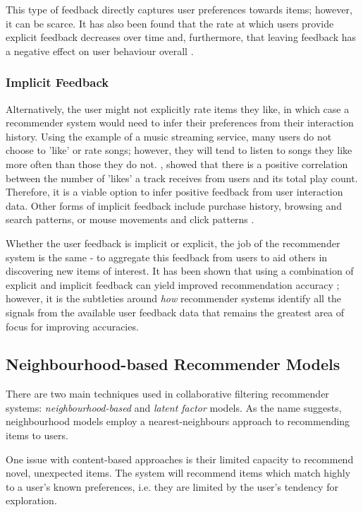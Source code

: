 This type of feedback directly captures user preferences towards items; however, it can be scarce. It has also been found that the rate at which users provide explicit feedback decreases over time and, furthermore, that leaving feedback has a negative effect on user behaviour overall \parencite{cf_1.5_explicit}.

\subsubsection{Implicit Feedback}
Alternatively, the user might not explicitly rate items they like, in which case a recommender system would need to infer their preferences from their interaction history. Using the example of a music streaming service, many users do not choose to 'like' or rate songs; however, they will tend to listen to songs they like more often than those they do not. \cite{cf_1.5_explicit}, showed that there is a positive correlation between the number of 'likes' a track receives from users and its total play count. Therefore, it is a viable option to infer positive feedback from user interaction data. Other forms of implicit feedback include purchase history, browsing and search patterns, or mouse movements and click patterns \parencite{handbook_1.5_cf}.

Whether the user feedback is implicit or explicit, the job of the recommender system is the same - to aggregate this feedback from users to aid others in discovering new items of interest. It has been shown that using a combination of explicit and implicit feedback can yield improved recommendation accuracy \parencite{cf_1.4_comparison}; however, it is the subtleties around \textit{how} recommender systems identify all the signals from the available user feedback data that remains the greatest area of focus for improving accuracies.

\subsection{Neighbourhood-based Recommender Models}
There are two main techniques used in collaborative filtering recommender systems: \textit{neighbourhood-based} and \textit{latent factor} models. As the name suggests, neighbourhood models employ a nearest-neighbours approach to recommending items to users.

One issue with content-based approaches is their limited capacity to recommend novel, unexpected items. The system will recommend items which match highly to a user's known preferences, i.e. they are limited by the user's tendency for exploration. \parencite{handbook_1.3_content-based}

